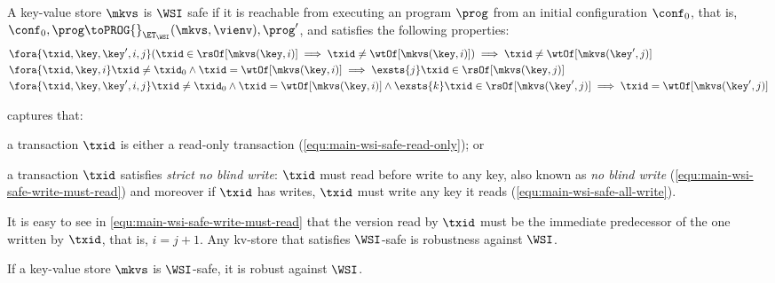 \begin{definition}
    \label{def:main-body-wsi-safe}
    A key-value store \( \mkvs \) is \(\WSI\) safe if it is 
    reachable from executing an program \( \prog \) from an initial configuration \( \conf_0 \),
    that is, \( \conf_0, \prog \toPROG{}_{\ET_\WSI} (\mkvs, \vienv), \prog' \),
    and satisfies the following properties:
    \begin{align}
         & \fora{\txid,\key, \key',i,j} ( \txid \in \rsOf[\mkvs(\key,i)] \implies \txid \neq \wtOf[\mkvs(\key,i)] ) \implies \txid \neq \wtOf[\mkvs(\key',j)] \label{equ:main-wsi-safe-read-only} \\
         & \fora{\txid,\key,i} \txid \neq \txid_0 \land \txid = \wtOf[\mkvs(\key,i)] \implies \exsts{j} \txid \in \rsOf[\mkvs(\key,j)] \label{equ:main-wsi-safe-write-must-read} \\
         & \fora{\txid,\key,\key',i, j} \txid \neq \txid_0 \land \txid = \wtOf[\mkvs(\key,i)] \land \exsts{k} \txid \in \rsOf[\mkvs(\key',j)] \implies \txid = \wtOf[\mkvs(\key',j)] \label{equ:main-wsi-safe-all-write}
    \end{align}
\end{definition}

 captures that:
\begin{enumerate*} 
    \item a transaction \( \txid \) is either a read-only transaction (\cref{equ:main-wsi-safe-read-only}); or
    \item a transaction \( \txid \) satisfies \emph{strict no blind write}: 
        \( \txid \) must read before write to any key, also known as \emph{no blind write} (\cref{equ:main-wsi-safe-write-must-read}) 
        and moreover if \( \txid \) has writes, \( \txid \) must write any key it reads (\cref{equ:main-wsi-safe-all-write}).
\end{enumerate*}
It is easy to see in \cref{equ:main-wsi-safe-write-must-read} that 
the version read by \( \txid \) must be the immediate predecessor of the one written by \( \txid \),
that is, \( i = j + 1 \).
Any kv-store that satisfies \( \WSI \)-safe is robustness against \( \WSI \).

\begin{theorem}
    If a key-value store \( \mkvs \) is \(\WSI\)-safe, it is robust against \(\WSI\).
\end{theorem}


